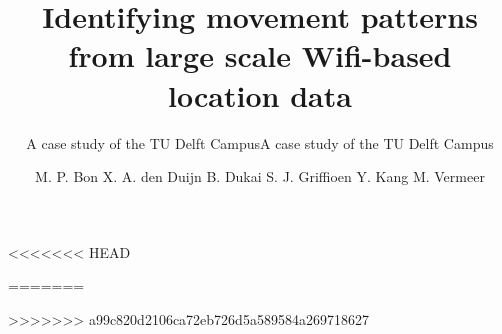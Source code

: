 \documentclass{tudelft-report}
\begin{document}
\frontmatter
\title[tudelft-black]{\fontsize{30}{5}\selectfont Identifying movement patterns from large scale Wifi-based location data}
<<<<<<< HEAD
\subtitle[tudelft-black]{\fontsize{20}{1.2}\selectfont\hspace{4cm}A case study of the TU Delft Campus}
=======
\subtitle[tudelft-black]{\fontsize{20}{1.2}\selectfont\hspace{0cm}A case study of the TU Delft Campus}
>>>>>>> a99c820d2106ca72eb726d5a589584a269718627
\author[tudelft-black]{\fontsize{12}{10}\selectfont M. P. Bon
\vskip 0.15cm X. A. den Duijn
\vskip 0.15cm B. Dukai
\vskip 0.15cm S. J. Griffioen
\vskip 0.15cm Y. Kang
\vskip 0.15cm M. Vermeer}
\makecover[split]

	



\tableofcontents

\mainmatter
%













%











\backmatter

\appendix

\nocite{*}
\printbibliography
\end{document}
